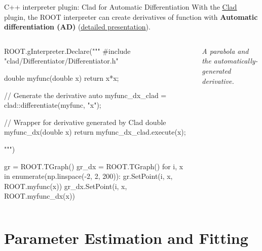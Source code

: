 \documentclass[aspectratio=169]{beamer}
\newcommand{\myfigure}[2]{
    \begin{figure}
        \makebox[\textwidth]{%
            \texttt{[image: \#2]}
        }
    \end{figure}
}
\newcommand{\myhref}[2]{{\color{blue}\href{#1}{\underline{#2}}}}
\begin{document}
\begin{frame}[fragile]{C++ interpreter plugin: Clad for Automatic Differentiation}
    With the \myhref{https://github.com/vgvassilev/clad/}{Clad} plugin, the ROOT interpreter can create derivatives of function with \textbf{Automatic differentiation (AD)} (\myhref{https://indico.cern.ch/event/1388327/contributions/5891648/attachments/2835755/4955568/Clad-Roofit-Workshop.pdf}{detailed presentation}).
\vspace{3mm}


    \begin{columns}
        \begin{column}{0.57\textwidth}
            \begin{myterminaltiny}
ROOT.gInterpreter.Declare("""
#include "clad/Differentiator/Differentiator.h"

double myfunc(double x) {
  return x*x;
}

// Generate the derivative
auto myfunc_dx_clad = clad::differentiate(myfunc, "x");

// Wrapper for derivative generated by Clad
double myfunc_dx(double x) {
  return myfunc_dx_clad.execute(x);
}

""")

gr = ROOT.TGraph()
gr_dx = ROOT.TGraph()
for i, x in enumerate(np.linspace(-2, 2, 200)):
    gr.SetPoint(i, x, ROOT.myfunc(x))
    gr_dx.SetPoint(i, x, ROOT.myfunc_dx(x))
            \end{myterminaltiny}

        \end{column}
        \begin{column}{0.43\textwidth}
            \myfigure{1.0}{clad.pdf}
            \textit{A parabola and the automatically-generated derivative.}
        \end{column}
    \end{columns}
\end{frame}


\section{Parameter Estimation and Fitting}
\end{document}
